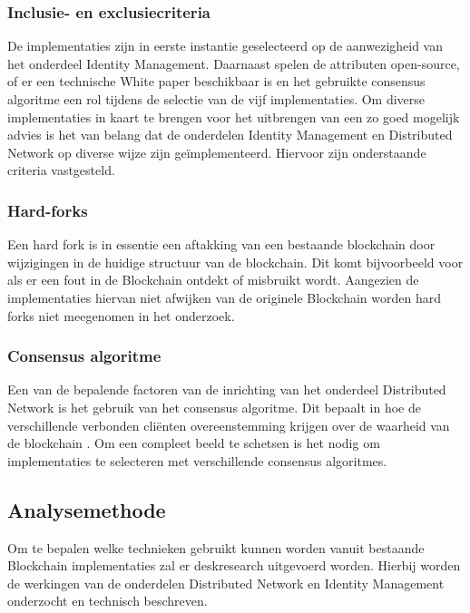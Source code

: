 \subsubsection{Inclusie- en exclusiecriteria}

De implementaties zijn in eerste instantie geselecteerd op de aanwezigheid van het onderdeel Identity Management. Daarnaast spelen de attributen open-source, of er een technische White paper beschikbaar is en het gebruikte consensus algoritme een rol tijdens de selectie van de vijf implementaties. Om diverse implementaties in kaart te brengen voor het uitbrengen van een zo goed mogelijk advies is het van belang dat de onderdelen Identity Management en Distributed Network op diverse wijze zijn geïmplementeerd. Hiervoor zijn onderstaande criteria vastgesteld.

\subsubsection{Hard-forks}

Een hard fork \citep{wiki:hardfork} is in essentie een aftakking van een bestaande blockchain door wijzigingen in de huidige structuur van de blockchain. Dit komt bijvoorbeeld voor als er een fout in de Blockchain ontdekt of misbruikt wordt. Aangezien de implementaties hiervan niet afwijken van de originele Blockchain worden hard forks niet meegenomen in het onderzoek.

\subsubsection{Consensus algoritme}

Een van de bepalende factoren van de inrichting van het onderdeel Distributed Network is het gebruik van het consensus algoritme. Dit bepaalt in hoe de verschillende verbonden cliënten overeenstemming krijgen over de waarheid van de blockchain \citep{medium:blockchain-fundamentals}. Om een compleet beeld te schetsen is het nodig om implementaties te selecteren met verschillende consensus algoritmes.

\subsection{Analysemethode}

Om te bepalen welke technieken gebruikt kunnen worden vanuit bestaande Blockchain implementaties zal er deskresearch uitgevoerd worden. Hierbij worden de werkingen van de onderdelen Distributed Network en Identity Management onderzocht en technisch beschreven.

